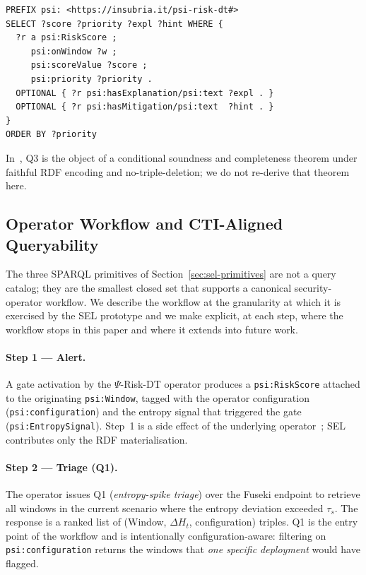 \documentclass[futureinternet,article,submit,pdftex,moreauthors]{Definitions/mdpi}
\newcommand{\psiop}{\ensuremath{\Psi}}
\newcommand{\EntropyDeviation}{\ensuremath{\Delta H}}
\newcommand{\taus}{\ensuremath{\tau_{s}}}
\begin{document}
\begin{lstlisting}[language=SPARQL]
PREFIX psi: <https://insubria.it/psi-risk-dt#>
SELECT ?score ?priority ?expl ?hint WHERE {
  ?r a psi:RiskScore ;
     psi:onWindow ?w ;
     psi:scoreValue ?score ;
     psi:priority ?priority .
  OPTIONAL { ?r psi:hasExplanation/psi:text ?expl . }
  OPTIONAL { ?r psi:hasMitigation/psi:text  ?hint . }
}
ORDER BY ?priority
\end{lstlisting}

In~\cite{paper5}, Q3 is the object of a conditional soundness and
completeness theorem under faithful RDF encoding and no-triple-deletion;
we do not re-derive that theorem here.

\subsection{Operator Workflow and CTI-Aligned Queryability}
\label{sec:sel-workflow}

The three SPARQL primitives of
Section~\ref{sec:sel-primitives} are not a query catalog; they are the
smallest closed set that supports a canonical security-operator
workflow. We describe the workflow at the granularity at which it is
exercised by the SEL prototype and we make explicit, at each step,
where the workflow stops in this paper and where it extends into future
work.

\paragraph{Step 1 --- Alert.} A gate activation by the $\psiop$-Risk-DT
operator produces a \texttt{psi:RiskScore} attached to the originating
\texttt{psi:Window}, tagged with the operator configuration
(\texttt{psi:configuration}) and the entropy signal that triggered the
gate (\texttt{psi:EntropySignal}). Step~1 is a side effect of the
underlying operator~\cite{paper3}; SEL contributes only the RDF
materialisation.

\paragraph{Step 2 --- Triage (Q1).} The operator issues Q1
(\emph{entropy-spike triage}) over the Fuseki endpoint to retrieve all
windows in the current scenario where the entropy deviation exceeded
$\taus$. The response is a ranked list of
(Window, $\EntropyDeviation_t$, configuration) triples. Q1 is the entry point of the
workflow and is intentionally configuration-aware: filtering on
\texttt{psi:configuration} returns the windows that \emph{one specific
deployment} would have flagged.
\end{document}

